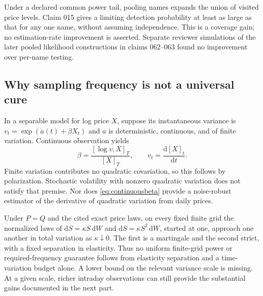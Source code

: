 Under a declared common power tail, pooling names expands the union of
visited price levels. Claim 015 gives a limiting detection probability at
least as large as that for any one name, without assuming independence.
This is a coverage gain; no estimation-rate improvement is asserted.
Separate reviewer simulations of the later pooled likelihood constructions
in claims 062--063 found no improvement over per-name testing.

\subsection{Why sampling frequency is not a universal cure}
In a separable model for log price $X$, suppose its instantaneous variance is
$v_t=\exp(a(t)+\beta X_t)$ and $a$ is deterministic, continuous, and of finite
variation. Continuous observation yields
\begin{equation}\label{eq:continuousbeta}
 \beta=\frac{[\log v,X]_T}{[X]_T},
 \qquad v_t=\frac{\mathrm{d}[X]_t}{\mathrm{d}t}.
\end{equation}
Finite variation contributes no quadratic covariation, so this follows by
polarization. Stochastic volatility with nonzero quadratic variation does
not satisfy that premise. Nor does \eqref{eq:continuousbeta} provide a
noise-robust estimator of the derivative of quadratic variation from daily
prices.

Under $P=Q$ and the cited exact price laws, on every fixed finite grid the
normalized laws of
$\mathrm{d}S=\kappa S\,\mathrm{d}W$ and
$\mathrm{d}S=\kappa S^2\,\mathrm{d}W$, started at one, approach one another in
total variation as $\kappa\downarrow0$. The first is a martingale and the
second strict, with a fixed separation in elasticity. Thus no uniform
finite-grid power or required-frequency guarantee follows from elasticity
separation and a time-variation budget alone. A lower bound on the relevant
variance scale is missing. At a given scale, richer intraday observations can still provide the
substantial gains documented in the next part.
